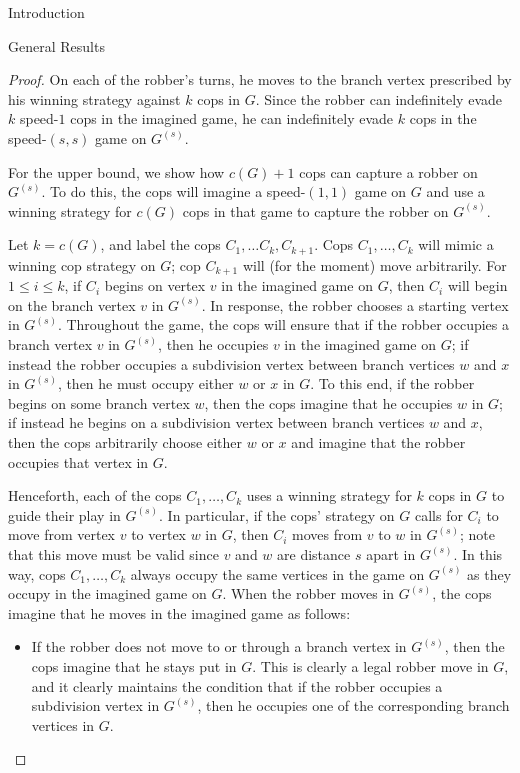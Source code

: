 \documentclass[12pt]{amsart}
\theoremstyle{definition}
\begin{document}
\begin{section}{Introduction}
\begin{section}{General Results}
\begin{proof}
    On each of the robber's turns, he moves to the branch vertex prescribed by his winning strategy against $k$ cops in $G$.  Since the robber can indefinitely evade $k$ speed-$1$ cops in the imagined game, he can indefinitely evade $k$ cops in the speed-$(s,s)$ game on $G^{(s)}$.

    For the upper bound, we show how $c(G)+1$ cops can capture a robber on $G^{(s)}$.  To do this, the cops will imagine a speed-$(1,1)$ game on $G$ and use a winning strategy for $c(G)$ cops in that game to capture the robber on $G^{(s)}$.

    Let $k=c(G)$, and label the cops $C_1, \dots C_k, C_{k+1}$.  Cops $C_1, \dots, C_k$ will mimic a winning cop strategy on $G$; cop $C_{k+1}$ will (for the moment) move arbitrarily.  For $1 \le i \le k$, if $C_i$ begins on vertex $v$ in the imagined game on $G$, then $C_i$ will begin on the branch vertex $v$ in $G^{(s)}$.  In response, the robber chooses a starting vertex in $G^{(s)}$.  Throughout the game, the cops will ensure that if the robber occupies a branch vertex $v$ in $G^{(s)}$, then he occupies $v$ in the imagined game on $G$; if instead the robber occupies a subdivision vertex between branch vertices $w$ and $x$ in $G^{(s)}$, then he must occupy either $w$ or $x$ in $G$.  To this end, if the robber begins on some branch vertex $w$, then the cops imagine that he occupies $w$ in $G$; if instead he begins on a subdivision vertex between branch vertices $w$ and $x$, then the cops arbitrarily choose either $w$ or $x$ and imagine that the robber occupies that vertex in $G$.

    Henceforth, each of the cops $C_1, \dots, C_k$ uses a winning strategy for $k$ cops in $G$ to guide their play in $G^{(s)}$.  In particular, if the cops' strategy on $G$ calls for $C_i$ to move from vertex $v$ to vertex $w$ in $G$, then $C_i$ moves from $v$ to $w$ in $G^{(s)}$; note that this move must be valid since $v$ and $w$ are distance $s$ apart in $G^{(s)}$.  In this way, cops $C_1, \dots, C_k$ always occupy the same vertices in the game on $G^{(s)}$ as they occupy in the imagined game on $G$.  When the robber moves in $G^{(s)}$, the cops imagine that he moves in the imagined game as follows:
    \begin{itemize}
    \item If the robber does not move to or through a branch vertex in $G^{(s)}$, then the cops imagine that he stays put in $G$.  This is clearly a legal robber move in $G$, and it clearly maintains the condition that if the robber occupies a subdivision vertex in $G^{(s)}$, then he occupies one of the corresponding branch vertices in $G$. 
    

\end{itemize}
\end{proof}
\end{section}
\end{section}
\end{document}
